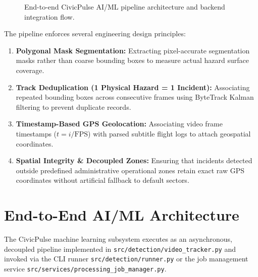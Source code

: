\documentclass[11pt,a4paper]{article}
\begin{document}
\begin{figure}[htbp]
\caption{End-to-end CivicPulse AI/ML pipeline architecture and backend integration flow.}
\label{fig:e2e_architecture}
\end{figure}

The pipeline enforces several engineering design principles:
\begin{enumerate}[leftmargin=*]
    \item \textbf{Polygonal Mask Segmentation:} Extracting pixel-accurate segmentation masks rather than coarse bounding boxes to measure actual hazard surface coverage.
    \item \textbf{Track Deduplication (1 Physical Hazard = 1 Incident):} Associating repeated bounding boxes across consecutive frames using ByteTrack Kalman filtering to prevent duplicate records.
    \item \textbf{Timestamp-Based GPS Geolocation:} Associating video frame timestamps ($t = i / \text{FPS}$) with parsed subtitle flight logs to attach geospatial coordinates.
    \item \textbf{Spatial Integrity \& Decoupled Zones:} Ensuring that incidents detected outside predefined administrative operational zones retain exact raw GPS coordinates without artificial fallback to default sectors.
\end{enumerate}

\section{End-to-End AI/ML Architecture}
The CivicPulse machine learning subsystem executes as an asynchronous, decoupled pipeline implemented in \texttt{src/detection/video\_tracker.py} and invoked via the CLI runner \texttt{src/detection/runner.py} or the job management service \texttt{src/services/processing\_job\_manager.py}.
\end{document}
